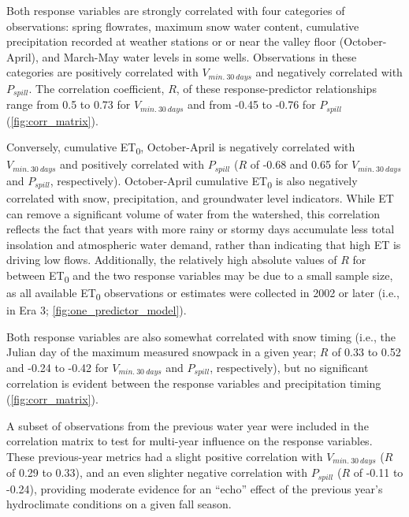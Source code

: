 \documentclass[hess, manuscript]{copernicus}
\begin{document}
Both response variables are strongly correlated with four categories of
observations: spring flowrates, maximum snow water content, cumulative
precipitation recorded at weather stations or or near the valley floor
(October-April), and March-May water levels in some wells. Observations
in these categories are positively correlated with \(V_{min.~30~days}\)
and negatively correlated with \(P_{spill}\). The correlation
coefficient, \(R\), of these response-predictor relationships range from
0.5 to 0.73 for \(V_{min.~30~days}\) and from -0.45 to -0.76 for
\(P_{spill}\) (\autoref{fig:corr_matrix}).

Conversely, cumulative ET\textsubscript{0}, October-April is negatively
correlated with \(V_{min.~30~days}\) and positively correlated with
\(P_{spill}\) (\(R\) of -0.68 and 0.65 for \(V_{min.~30~days}\) and
\(P_{spill}\), respectively). October-April cumulative
ET\textsubscript{0} is also negatively correlated with snow,
precipitation, and groundwater level indicators. While ET can remove a
significant volume of water from the watershed, this correlation
reflects the fact that years with more rainy or stormy days accumulate
less total insolation and atmospheric water demand, rather than
indicating that high ET is driving low flows. Additionally, the
relatively high absolute values of \(R\) for between ET\textsubscript{0}
and the two response variables may be due to a small sample size, as all
available ET\textsubscript{0} observations or estimates were collected
in 2002 or later (i.e., in Era 3; \autoref{fig:one_predictor_model}).

Both response variables are also somewhat correlated with snow timing
(i.e., the Julian day of the maximum measured snowpack in a given year;
\(R\) of 0.33 to 0.52 and -0.24 to -0.42 for \(V_{min.~30~days}\) and
\(P_{spill}\), respectively), but no significant correlation is evident
between the response variables and precipitation timing
(\autoref{fig:corr_matrix}).

A subset of observations from the previous water year were included in
the correlation matrix to test for multi-year influence on the response
variables. These previous-year metrics had a slight positive correlation
with \(V_{min.~30~days}\) (\(R\) of 0.29 to 0.33), and an even slighter
negative correlation with \(P_{spill}\) (\(R\) of -0.11 to -0.24),
providing moderate evidence for an ``echo'' effect of the previous
year's hydroclimate conditions on a given fall season.
\end{document}
